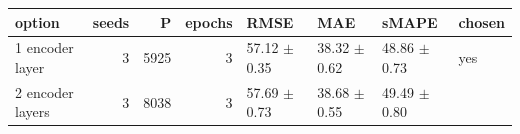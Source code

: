 \begin{tabular}{lrrrllll}
\toprule
option & seeds & P & epochs & RMSE & MAE & sMAPE & chosen \\
\midrule
1 encoder layer & 3 & 5925 & 3 & 57.12 $\pm$ 0.35 & 38.32 $\pm$ 0.62 & 48.86 $\pm$ 0.73 & yes \\
2 encoder layers & 3 & 8038 & 3 & 57.69 $\pm$ 0.73 & 38.68 $\pm$ 0.55 & 49.49 $\pm$ 0.80 &  \\
\bottomrule
\end{tabular}
